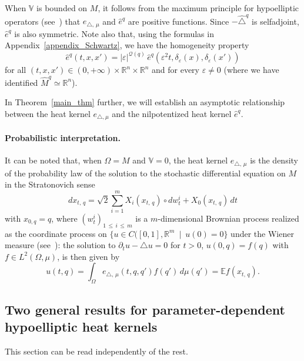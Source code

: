 \documentclass[10pt]{amsart}
\theoremstyle{definition}\newtheorem{defi}[theo]{Definition}\newtheorem{rema}[theo]{Remark}\newtheorem{exam}[theo]{Example}\newtheorem{exem}[theo]{Example}\newtheorem{nota}[theo]{Notation}
\newcommand*\R{\mathbb{R}}
\newcommand{\bbV}{\mathbb{V}}
\newcommand{\bbE}{\mathbb{E}}
\newcommand{\calQ}{\mathcal{Q}}
\renewcommand{\leq}{\leqslant}
\begin{document}
When $\bbV$ is bounded on $M$, it follows from the maximum principle for hypoelliptic operators (see~\cite{Bony}) that $e_{\triangle,\,\mu}$ and $\widehat{e}^{q}$ are positive functions. Since $-\widehat\triangle^{q}$ is selfadjoint, $\widehat{e}^{q}$ is also symmetric. Note also that, using the formulas in Appendix~\ref{appendix_Schwartz}, we have the homogeneity property
\begin{equation}\label{homog_nilp}
\widehat{e}^{q}(t,x,x') = \vert\varepsilon\vert^{\calQ(q)}\, \widehat{e}^{q}\left(\varepsilon^2 t,\delta_\varepsilon(x),\delta_\varepsilon(x')\right)
\end{equation}
for all $(t,x,x')\in(0,+\infty)\times\R^n\times\R^n$ and for every $\varepsilon\neq 0$ (where we have identified $\widehat{M}^{q}\simeq\R^n$).

In Theorem~\ref{main_thm} further, we will establish an asymptotic relationship between the heat kernel $e_{\triangle,\mu}$ and the nilpotentized heat kernel $\widehat{e}^{q}$.

\paragraph{Probabilistic interpretation.}
It can be noted that, when $\Omega=M$ and $\bbV=0$, the heat kernel $e_{\triangle,\,\mu}$ is the density of the probability law of the solution to the stochastic differential equation on $M$ in the Stratonovich sense
\[
dx_{t,\,q} = \sqrt{2}\sum_{i=1}^m X_i(x_{t,\,q})\circ dw_t^i + X_0(x_{t,\,q})\, dt
\]
with $x_{0,q}=q$, where $(w_t^i)_{1\,\leq\,i\,\leq\,m}$ is a $m$-dimensional Brownian process realized as the coordinate process on $\{u\in C([0,1],\R^m\ \mid\ u(0)=0\}$ under the Wiener measure (see~\cite{BenArous_AIF1989}): the solution to $\partial_t u-\triangle u=0$ for $t>0$, $u(0,q)=f(q)$ with $f\in L^2(\Omega,\mu)$, is then given by
\[
u(t,q) = \int_\Omega e_{\triangle,\,\mu}(t,q,q')f(q')\, d\mu(q') = \bbE f(x_{t,\,q}).
\]


\subsection{Two general results for parameter-dependent hypoelliptic heat kernels}\label{sec_two_general_results}

This section can be read independently of the rest.
\end{document}
